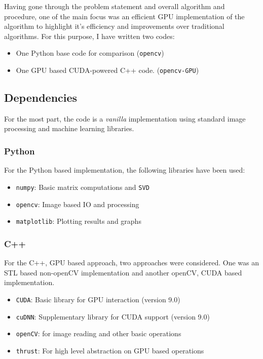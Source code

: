 Having gone through the problem statement and overall algorithm and
procedure, one of the main focus was an efficient GPU implementation of
the algorithm to highlight it's efficiency and improvements over
traditional algorithms. For this purpose, I have written two codes:

\begin{itemize}
  \tightlist
  \item
  One Python base code for comparison (\texttt{opencv})
  \item
  One GPU based CUDA-powered C++ code. (\texttt{opencv-GPU})
\end{itemize}

\hypertarget{dependencies}{%
\subsection{Dependencies}\label{dependencies}}

For the most part, the code is a \emph{vanilla} implementation using
standard image processing and machine learning libraries.

\hypertarget{python}{%
\subsubsection{Python}\label{python}}

For the Python based implementation, the following libraries have been
used:

\begin{itemize}
  \tightlist
  \item
  \texttt{numpy}: Basic matrix computations and \texttt{SVD}
  \item
  \texttt{opencv}: Image based IO and processing
  \item
  \texttt{matplotlib}: Plotting results and graphs
\end{itemize}

\hypertarget{c}{%
\subsubsection{C++}\label{c}}

For the C++, GPU based approach, two approaches were considered. One was
an STL based non-openCV implementation and another openCV, CUDA based
implementation.

\begin{itemize}
  \tightlist
  \item
  \texttt{CUDA}: Basic library for GPU interaction (version 9.0)
  \item
  \texttt{cuDNN}: Supplementary library for CUDA support (version 9.0)
  \item
  \texttt{openCV}: for image reading and other basic operations
  \item
  \texttt{thrust}: For high level abstraction on GPU based operations
\end{itemize}

